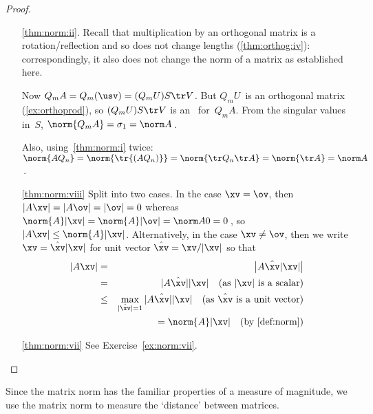 \begin{proof}
\begin{itemize}
\item[\ref{thm:norm:ii}.]
Recall that multiplication by an orthogonal matrix is a rotation\slash reflection and so does not change lengths (\autoref{thm:orthog:iv}): correspondingly, it also does not change the norm of a matrix as established here.

Now \(Q_mA=Q_m(\usv)=(Q_mU)S\tr V\).
But \(Q_mU\)~is an orthogonal matrix (\autoref{ex:orthoprod}),
so \((Q_mU)S\tr V\) is an \svd\ for~\(Q_mA\).
From the singular values in~\(S\), \(\norm{Q_mA}=\sigma_1=\norm A\)\,.

Also, using~\ref{thm:norm:i} twice: \(\norm{AQ_n}=\norm{\tr{(AQ_n)}}=\norm{\tr Q_n\tr A}=\norm{\tr A}=\norm A\)\,.

\item[\ref{thm:norm:viii}]
Split into two cases.
In the case \(\xv=\ov\), then \(|A\xv|=|A\ov|=|\ov|=0\) whereas \(\norm{A}|\xv|=\norm{A}|\ov|=\norm A0=0\)\,, so \(|A\xv|\leq\norm{A}|\xv|\).
Alternatively, in the case \(\xv\neq\ov\), then we write \(\xv=\hat{\xv}|\xv|\) for unit vector \(\hat{\xv}=\xv/|\xv|\)  so that
\begin{eqnarray*}
|A\xv|&=&\big|A\hat{\xv}|\xv|\big|
\\&=&|A\hat{\xv}||\xv| \quad(\text{as }|\xv|\text{ is a scalar})
\\&\leq&\max_{|\hat{\xv}|=1}|A\hat{\xv}||\xv|
\quad(\text{as }\hat{\xv}\text{ is a unit vector})
\\&&{}=\norm{A}|\xv|\quad(\text{by \autoref{def:norm}})
\end{eqnarray*}


\item[\ref{thm:norm:vii}] See {Exercise}~\ref{ex:norm:vii}.
\end{itemize}
\end{proof}




Since the matrix norm has the familiar properties of a measure of magnitude, we use the matrix norm to measure the `distance' between matrices.

